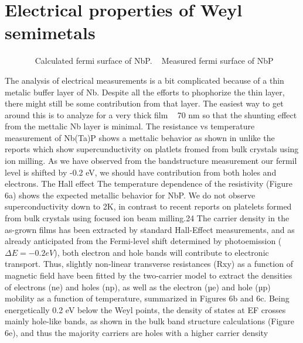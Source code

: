 \section{Electrical properties of Weyl semimetals}

\begin{figure}
    \centering
    \caption{
        \sfA~ Calculated fermi surface of NbP.
        \sfB~ Measured fermi surface of NbP
    }

    
\end{figure}

The analysis of electrical measurements is a bit complicated because of a thin metalic buffer layer
of Nb. Despite all the efforts to phophorize the thin layer, there might still be some contribution
from that layer. The easiest way to get around this is to analyze for a very thick film ~ 70 \si{nm}
so that the shunting effect from the mettalic Nb layer is minimal. The resistance vs temperature
measurement of Nb(Ta)P shows a mettalic behavior as shown in  unlike the reports which
show supercunductivity on platlets fromed from bulk crystals using ion milling. As we have observed
from the bandstructure measurement our fermil level is shifted by -0.2 \si{eV}, we should have 
contribution from both holes and electrons. The Hall effect 
The temperature 
dependence of the resistivity (Figure 6a) shows the expected metallic behavior for NbP.
We do not observe superconductivity down to 2K, in contrast to recent reports on platelets 
formed from bulk crystals using focused ion beam milling.24 The carrier density in the as-grown 
films has been extracted by standard Hall-Effect measurements, and as already anticipated from 
the Fermi-level shift determined by photoemission ($\Delta E= -0.2eV$), both electron and hole bands will 
contribute to electronic transport.  Thus, slightly non-linear transverse resistances (Rxy) as a 
function of magnetic field have been fitted by the two-carrier model to extract the densities of 
electrons (ne) and holes (np), as well as the electron (µe) and hole (µp) mobility as a function 
of temperature, summarized in Figures 6b and 6c.  Being energetically 0.2 eV below the Weyl points, 
the density of states at EF crosses mainly hole-like bands, as shown in the bulk band structure 
calculations (Figure 6e), and thus the majority carriers are holes with a higher carrier density 
